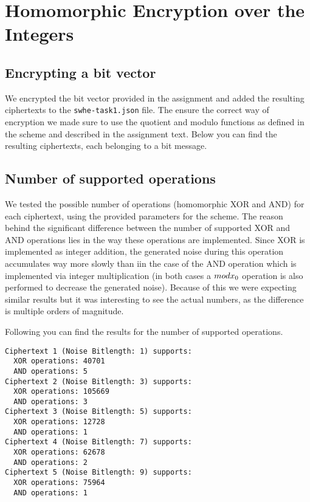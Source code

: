 \section{Homomorphic Encryption over the Integers}

\subsection{Encrypting a bit vector}

We encrypted the bit vector provided in the assignment and added the resulting ciphertexts to the \texttt{swhe-task1.json} file. The ensure the correct way of encryption we made sure to use the quotient and modulo functions as defined in the scheme and described in the assignment text. Below you can find the resulting ciphertexts, each belonging to a bit message.

\subsection{Number of supported operations}

We tested the possible number of operations (homomorphic XOR and AND) for each ciphertext, using the provided parameters for the scheme. The reason behind the significant difference between the number of supported XOR and AND operations lies in the way these operations are implemented. Since XOR is implemented as integer addition, the generated noise during this operation accumulates way more slowly than iin the case of the AND operation which is implemented via integer multiplication (in both cases a $mod x\textsubscript{0}$ operation is also performed to decrease the generated noise). Because of this we were expecting similar results but it was interesting to see the actual numbers, as the difference is multiple orders of magnitude.

Following you can find the results for the number of supported operations.

\begin{verbatim}
Ciphertext 1 (Noise Bitlength: 1) supports:
  XOR operations: 40701
  AND operations: 5
Ciphertext 2 (Noise Bitlength: 3) supports:
  XOR operations: 105669
  AND operations: 3
Ciphertext 3 (Noise Bitlength: 5) supports:
  XOR operations: 12728
  AND operations: 1
Ciphertext 4 (Noise Bitlength: 7) supports:
  XOR operations: 62678
  AND operations: 2
Ciphertext 5 (Noise Bitlength: 9) supports:
  XOR operations: 75964
  AND operations: 1
\end{verbatim}
